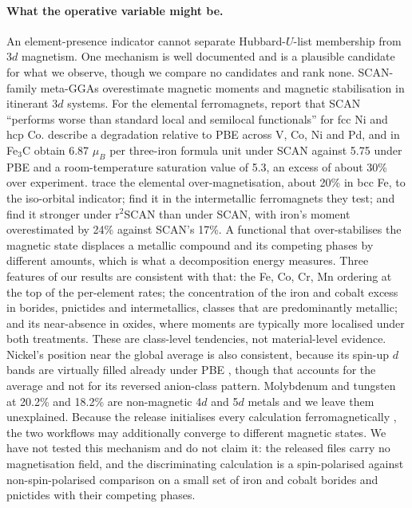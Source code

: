 \documentclass[11pt]{article}
\begin{document}
\paragraph{What the operative variable might be.} An element-presence indicator cannot
separate Hubbard-$U$-list membership from 3$d$ magnetism. One mechanism is well
documented and is a plausible candidate for what we observe, though we compare no
candidates and rank none. SCAN-family meta-GGAs overestimate magnetic moments and
magnetic stabilisation in itinerant 3$d$ systems. For the elemental ferromagnets,
\citet{ekholm2018} report that SCAN ``performs worse than standard local and semilocal
functionals'' for fcc Ni and hcp Co. \citet{fusingh2018} describe a degradation relative
to PBE across V, Co, Ni and Pd, and in Fe$_3$C obtain 6.87 $\mu_B$ per three-iron formula
unit under SCAN against 5.75 under PBE and a room-temperature saturation value of 5.3, an
excess of about 30\% over experiment. \citet{mejia2019} trace the elemental
over-magnetisation, about 20\% in bcc Fe, to the iso-orbital indicator;
\citet{tran2020} find it in the intermetallic ferromagnets they test; and
\citet{kothakonda2023} find it stronger under r$^2$SCAN than under SCAN, with iron's
moment overestimated by 24\% against SCAN's 17\%. A functional that
over-stabilises the magnetic state displaces a metallic compound and its competing
phases by different amounts, which is what a decomposition energy measures. Three
features of our results are consistent with that: the Fe, Co, Cr, Mn ordering at the top
of the per-element rates; the concentration of the iron and cobalt excess in borides,
pnictides and intermetallics, classes that are predominantly metallic; and its
near-absence in oxides, where moments are typically more localised under both
treatments. These are class-level tendencies, not material-level evidence. Nickel's position near the global average
is also consistent, because its spin-up $d$ bands are virtually filled already under
PBE \citep{ekholm2018}, though that accounts for the average and not for its reversed
anion-class pattern. Molybdenum and tungsten at 20.2\% and 18.2\% are non-magnetic 4$d$
and 5$d$ metals and we leave them unexplained. Because the release initialises every
calculation ferromagnetically \citep{merchant2023}, the two workflows may additionally
converge to different magnetic states. We have not tested this mechanism and do not
claim it: the released files carry no magnetisation field, and the discriminating
calculation is a spin-polarised against non-spin-polarised comparison on a small set of
iron and cobalt borides and pnictides with their competing phases.
\end{document}
